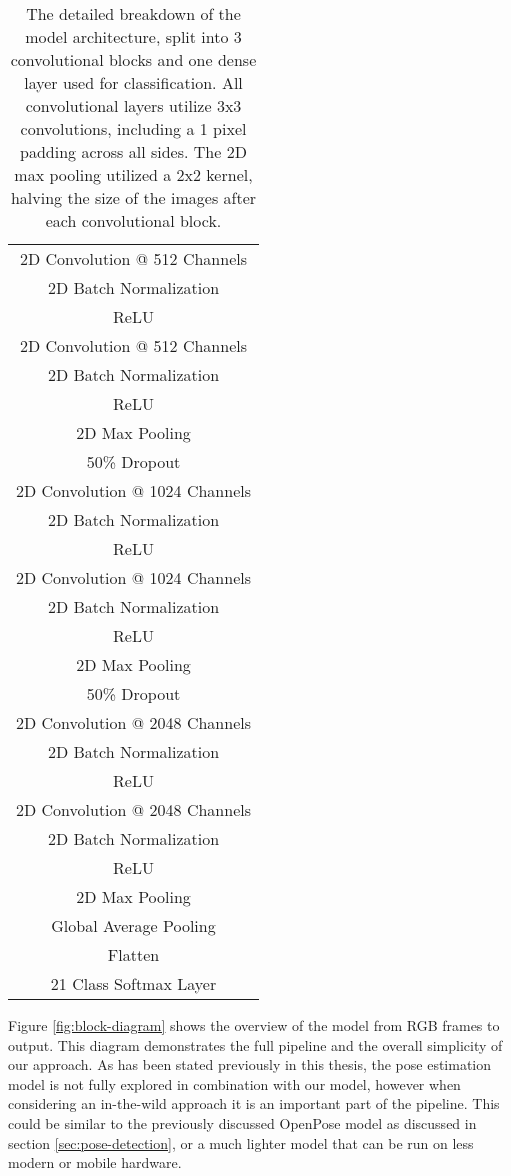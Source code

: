 \begin{table}[ht]
	\centering
	\begin{tabular}{||c||}
		\hline
		2D Convolution @ 512 Channels \\
		2D Batch Normalization \\
		ReLU \\
		2D Convolution @ 512 Channels \\
		2D Batch Normalization \\
		ReLU \\
		2D Max Pooling\\
		\hline\hline
		50\% Dropout \\
		2D Convolution @ 1024 Channels \\
		2D Batch Normalization \\
		ReLU \\
		2D Convolution @ 1024 Channels \\
		2D Batch Normalization \\
		ReLU \\
		2D Max Pooling\\
		\hline\hline
		50\% Dropout \\
		2D Convolution @ 2048 Channels \\
		2D Batch Normalization \\
		ReLU \\
		2D Convolution @ 2048 Channels \\
		2D Batch Normalization \\
		ReLU \\
		2D Max Pooling\\
		\hline\hline
		Global Average Pooling \\
		Flatten \\
		21 Class Softmax Layer \\
		\hline
	\end{tabular}
	\caption{The detailed breakdown of the model architecture, split into 3 convolutional blocks and one dense layer used for classification. All convolutional layers utilize 3x3 convolutions, including a 1 pixel padding across all sides. The 2D max pooling utilized a 2x2 kernel, halving the size of the images after each convolutional block.}
	\label{tab:detailed-model}
\end{table}

Figure \ref{fig:block-diagram} shows the overview of the model from RGB frames to output. This diagram demonstrates the full pipeline and the overall simplicity of our approach. As has been stated previously in this thesis, the pose estimation model is not fully explored in combination with our model, however when considering an in-the-wild approach it is an important part of the pipeline. This could be similar to the previously discussed OpenPose \cite{openpose} model as discussed in section \ref{sec:pose-detection}, or a much lighter model that can be run on less modern or mobile hardware.

